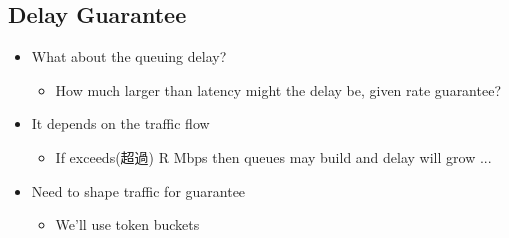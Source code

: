 \documentclass[12pt]{ctexart}   %
\begin{document}
	\subsection{Delay Guarantee}
	\begin{itemize}
		\item What about the queuing delay?
		\begin{itemize}
			\item How much larger than latency might the delay be, given rate guarantee?
		\end{itemize}

		\item  It depends on the traffic flow
		\begin{itemize}
			\item If exceeds(超過) R Mbps then queues may build and delay will grow ...
		\end{itemize}

		\item  Need to shape traffic for guarantee
		\begin{itemize}
			\item We'll use token buckets
		\end{itemize}
	\end{itemize}
\end{document}
